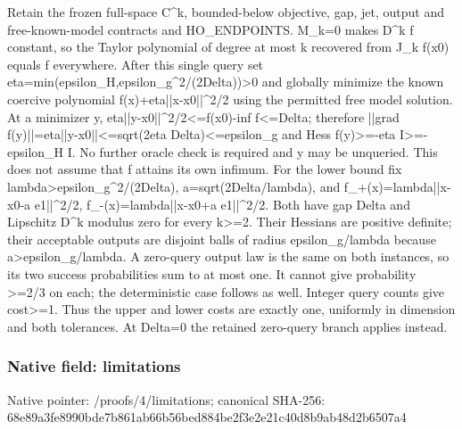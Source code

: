 \documentclass[10pt,a4paper]{article}
\begin{document}
\begingroup\raggedright\sloppy Retain the frozen full-space C\textasciicircum{}k,\allowbreak{} bounded-below objective,\allowbreak{} gap,\allowbreak{} jet,\allowbreak{} output and free-known-model contracts and HO\_\allowbreak{}ENDPOINTS. M\_\allowbreak{}k=\allowbreak{}0 makes D\textasciicircum{}k f constant,\allowbreak{} so the Taylor polynomial of degree at most k recovered from J\_\allowbreak{}k f(x0) equals f everywhere. After this single query set eta=\allowbreak{}min(epsilon\_\allowbreak{}H,\allowbreak{}epsilon\_\allowbreak{}g\textasciicircum{}2/\allowbreak{}(2Delta))>0 and globally minimize the known coercive polynomial f(x)+eta||x-x0||\textasciicircum{}2/\allowbreak{}2 using the permitted free model solution. At a minimizer y,\allowbreak{} eta||y-x0||\textasciicircum{}2/\allowbreak{}2<=\allowbreak{}f(x0)-inf f<=\allowbreak{}Delta;\allowbreak{} therefore ||grad f(y)||=\allowbreak{}eta||y-x0||<=\allowbreak{}sqrt(2eta Delta)<=\allowbreak{}epsilon\_\allowbreak{}g and Hess f(y)>=\allowbreak{}-eta I>=\allowbreak{}-epsilon\_\allowbreak{}H I. No further oracle check is required and y may be unqueried. This does not assume that f attains its own infimum. For the lower bound fix lambda>epsilon\_\allowbreak{}g\textasciicircum{}2/\allowbreak{}(2Delta),\allowbreak{} a=\allowbreak{}sqrt(2Delta/\allowbreak{}lambda),\allowbreak{} and f\_\allowbreak{}+(x)=\allowbreak{}lambda||x-x0-a e1||\textasciicircum{}2/\allowbreak{}2,\allowbreak{} f\_\allowbreak{}-(x)=\allowbreak{}lambda||x-x0+a e1||\textasciicircum{}2/\allowbreak{}2. Both have gap Delta and Lipschitz D\textasciicircum{}k modulus zero for every k>=\allowbreak{}2. Their Hessians are positive definite;\allowbreak{} their acceptable outputs are disjoint balls of radius epsilon\_\allowbreak{}g/\allowbreak{}lambda because a>epsilon\_\allowbreak{}g/\allowbreak{}lambda. A zero-query output law is the same on both instances,\allowbreak{} so its two success probabilities sum to at most one. It cannot give probability >=\allowbreak{}2/\allowbreak{}3 on each;\allowbreak{} the deterministic case follows as well. Integer query counts give cost>=\allowbreak{}1. Thus the upper and lower costs are exactly one,\allowbreak{} uniformly in dimension and both tolerances. At Delta=\allowbreak{}0 the retained zero-query branch applies instead.\par\endgroup

\subsubsection{Native field: limitations}
Native pointer: /proofs/4/limitations; canonical SHA-256: 68e89a3fe8990bde7b861ab66b56bed884be2f3e2e21c40d8b9ab48d2b6507a4
\end{document}
